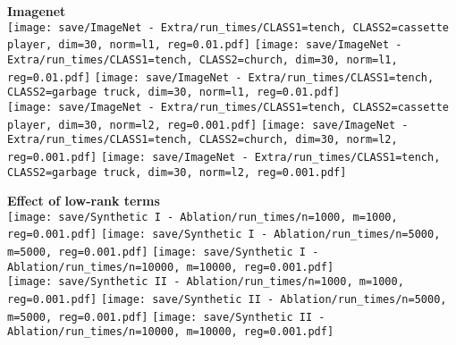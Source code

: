 {    \vspace{0.5em}

    \begin{minipage}[c]{0.48\textwidth}
        \centering
        \vspace{0.5em}
        {\bf\color{sufered} Imagenet} \\ \vspace{0.3em}
        \texttt{[image: save/ImageNet - Extra/run\_times/CLASS1=tench, CLASS2=cassette player, dim=30, norm=l1, reg=0.01.pdf]}
        \texttt{[image: save/ImageNet - Extra/run\_times/CLASS1=tench, CLASS2=church, dim=30, norm=l1, reg=0.01.pdf]}
        \texttt{[image: save/ImageNet - Extra/run\_times/CLASS1=tench, CLASS2=garbage truck, dim=30, norm=l1, reg=0.01.pdf]} \\
        \texttt{[image: save/ImageNet - Extra/run\_times/CLASS1=tench, CLASS2=cassette player, dim=30, norm=l2, reg=0.001.pdf]}
        \texttt{[image: save/ImageNet - Extra/run\_times/CLASS1=tench, CLASS2=church, dim=30, norm=l2, reg=0.001.pdf]}
        \texttt{[image: save/ImageNet - Extra/run\_times/CLASS1=tench, CLASS2=garbage truck, dim=30, norm=l2, reg=0.001.pdf]} \\
    \end{minipage}
    \hfill
    \begin{minipage}[c]{0.48\textwidth}
        \centering
        \vspace{0.5em}
        {\bf\color{sufered} Effect of low-rank terms} \\ \vspace{0.3em}
        \texttt{[image: save/Synthetic I - Ablation/run\_times/n=1000, m=1000, reg=0.001.pdf]}
        \texttt{[image: save/Synthetic I - Ablation/run\_times/n=5000, m=5000, reg=0.001.pdf]}
        \texttt{[image: save/Synthetic I - Ablation/run\_times/n=10000, m=10000, reg=0.001.pdf]} \\
        \texttt{[image: save/Synthetic II - Ablation/run\_times/n=1000, m=1000, reg=0.001.pdf]}
        \texttt{[image: save/Synthetic II - Ablation/run\_times/n=5000, m=5000, reg=0.001.pdf]}
        \texttt{[image: save/Synthetic II - Ablation/run\_times/n=10000, m=10000, reg=0.001.pdf]} \\
    \end{minipage}

}